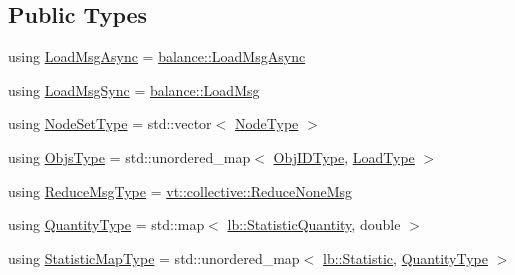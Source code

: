 \subsection*{Public Types}
\begin{DoxyCompactItemize}
\item 
using \hyperlink{structvt_1_1vrt_1_1collection_1_1lb_1_1_tempered_l_b_a38d9ad7e92612cdbdf564b6f49b516a7}{Load\+Msg\+Async} = \hyperlink{structvt_1_1vrt_1_1collection_1_1balance_1_1_load_msg_async}{balance\+::\+Load\+Msg\+Async}
\item 
using \hyperlink{structvt_1_1vrt_1_1collection_1_1lb_1_1_tempered_l_b_aa46eb8cbc4c505f35b970f75e38b5e0d}{Load\+Msg\+Sync} = \hyperlink{structvt_1_1vrt_1_1collection_1_1balance_1_1_load_msg}{balance\+::\+Load\+Msg}
\item 
using \hyperlink{structvt_1_1vrt_1_1collection_1_1lb_1_1_tempered_l_b_aa18a0edaf10119e307e7209371caa673}{Node\+Set\+Type} = std\+::vector$<$ \hyperlink{namespacevt_a866da9d0efc19c0a1ce79e9e492f47e2}{Node\+Type} $>$
\item 
using \hyperlink{structvt_1_1vrt_1_1collection_1_1lb_1_1_tempered_l_b_ad54faf59319f1b33dec689ee853d688e}{Objs\+Type} = std\+::unordered\+\_\+map$<$ \hyperlink{structvt_1_1vrt_1_1collection_1_1lb_1_1_base_l_b_a790b22acf448880599724749cdc4e9b3}{Obj\+I\+D\+Type}, \hyperlink{structvt_1_1vrt_1_1collection_1_1lb_1_1_base_l_b_a215e22b9f12678303f49615ae3be05cc}{Load\+Type} $>$
\item 
using \hyperlink{structvt_1_1vrt_1_1collection_1_1lb_1_1_tempered_l_b_a3e688a286b16334d43666bae581231b7}{Reduce\+Msg\+Type} = \hyperlink{namespacevt_1_1collective_aa439a90f05078f2bcf918641c951946f}{vt\+::collective\+::\+Reduce\+None\+Msg}
\item 
using \hyperlink{structvt_1_1vrt_1_1collection_1_1lb_1_1_tempered_l_b_aea04b60ba909fbd4ec49d1d9f9fb632c}{Quantity\+Type} = std\+::map$<$ \hyperlink{namespacevt_1_1vrt_1_1collection_1_1lb_a74989c7b4dd16fcc067e90a29cd1febe}{lb\+::\+Statistic\+Quantity}, double $>$
\item 
using \hyperlink{structvt_1_1vrt_1_1collection_1_1lb_1_1_tempered_l_b_ad9f4a2ede0929ca64fc6108cc812db33}{Statistic\+Map\+Type} = std\+::unordered\+\_\+map$<$ \hyperlink{namespacevt_1_1vrt_1_1collection_1_1lb_af0e20ef9afee77295053aa83bf1348b1}{lb\+::\+Statistic}, \hyperlink{structvt_1_1vrt_1_1collection_1_1lb_1_1_base_l_b_a864b2c437d81680577013741e265ef0d}{Quantity\+Type} $>$
\end{DoxyCompactItemize}
